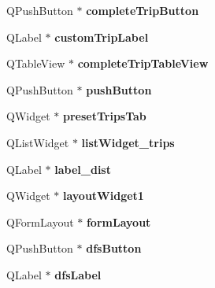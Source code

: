 \begin{DoxyCompactItemize}
Q\+Push\+Button $\ast$ {\bfseries complete\+Trip\+Button}
\item 
\mbox{\label{class_ui___main_window_a0447e20369c6e3b71d02ce9d6df43b03}} 
Q\+Label $\ast$ {\bfseries custom\+Trip\+Label}
\item 
\mbox{\label{class_ui___main_window_abb40a84b11421663c136cffc466ff592}} 
Q\+Table\+View $\ast$ {\bfseries complete\+Trip\+Table\+View}
\item 
\mbox{\label{class_ui___main_window_ad332d93084584930878f1daf5f84cdbf}} 
Q\+Push\+Button $\ast$ {\bfseries push\+Button}
\item 
\mbox{\label{class_ui___main_window_a41abee7931c1a1113c7d54714000a972}} 
Q\+Widget $\ast$ {\bfseries preset\+Trips\+Tab}
\item 
\mbox{\label{class_ui___main_window_a73cbec084bea5d1160d118cb24fe4d4c}} 
Q\+List\+Widget $\ast$ {\bfseries list\+Widget\+\_\+trips}
\item 
\mbox{\label{class_ui___main_window_ac6d1f5407b5d0e7f36fd79ba76b3f689}} 
Q\+Label $\ast$ {\bfseries label\+\_\+dist}
\item 
\mbox{\label{class_ui___main_window_aab31b3dec8d767525dea6f163e029e48}} 
Q\+Widget $\ast$ {\bfseries layout\+Widget1}
\item 
\mbox{\label{class_ui___main_window_afedcce3d8f3dddf4c1fd5b768660b8ee}} 
Q\+Form\+Layout $\ast$ {\bfseries form\+Layout}
\item 
\mbox{\label{class_ui___main_window_aff7c5d284b3ccfd5a63670024f8dbf0c}} 
Q\+Push\+Button $\ast$ {\bfseries dfs\+Button}
\item 
\mbox{\label{class_ui___main_window_ada90d26bb9319fb66aa0b19ef0bdb238}} 
Q\+Label $\ast$ {\bfseries dfs\+Label}
\item 
\mbox{\label{class_ui___main_window_a500730d325159f31563a0ff192f9b0b3}} 

\end{DoxyCompactItemize}
